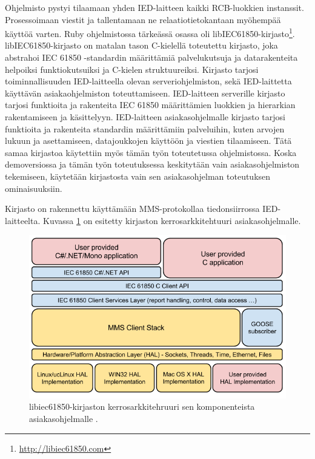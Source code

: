 Ohjelmisto pystyi tilaamaan yhden IED-laitteen kaikki RCB-luokkien instanssit. Prosessoimaan viestit ja tallentamaan ne relaatiotietokantaan myöhempää käyttöä varten. Ruby ohjelmistossa tärkeässä osassa oli libIEC61850-kirjasto\footnote{\url{http://libiec61850.com}}. libIEC61850-kirjasto on matalan tason C-kielellä toteutettu kirjasto, joka abstrahoi IEC 61850 -standardin määrittämiä palvelukutsuja ja datarakenteita helpoiksi funktiokutsuiksi ja C-kielen struktuureiksi. Kirjasto tarjosi toiminnallisuuden IED-laitteella olevan serveriohjelmiston, sekä IED-laittetta käyttävän asiakaohjelmiston toteuttamiseen. IED-laitteen serverille kirjasto tarjosi funktioita ja rakenteita IEC 61850 määrittämien luokkien ja hierarkian rakentamiseen ja käsittelyyn. IED-laitteen asiakasohjelmalle kirjasto tarjosi funktioita ja rakenteita standardin määrittämiin palveluihin, kuten arvojen lukuun ja asettamiseen, datajoukkojen käyttöön ja viestien tilaamiseen. Tätä samaa kirjastoa käytettiin myös tämän työn toteutetussa ohjelmistossa. Koska demoversiossa ja tämän työn toteutuksessa keskitytään vain asiakasohjelmiston tekemiseen, käytetään kirjastosta vain sen asiakasohjelman toteutuksen ominaisuuksiin.

Kirjasto on rakennettu käyttämään MMS-protokollaa tiedonsiirrossa IED-laitteelta. Kuvassa \ref{fig:libiec61850-layer-architecture} on esitetty kirjaston kerrosarkkitehtuuri asiakasohjelmalle.

\begin{figure}
	\includegraphics[width=1\textwidth]{pictures/libiec61850-layer-architecture.png}
	\caption{libiec61850-kirjaston kerrosarkkitehruuri sen komponenteista asiakasohjelmalle \cite{libIEC61850-api-overview}.}
	\label{fig:libiec61850-layer-architecture}
\end{figure}


